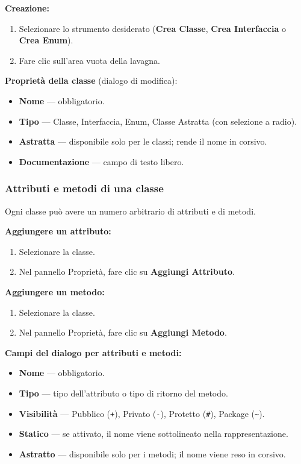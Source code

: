 \documentclass[a4paper,11pt]{article}
\newcommand{\uielement}[1]{\textbf{#1}}
\begin{document}
\textbf{Creazione:}
\begin{enumerate}
  \item Selezionare lo strumento desiderato (\uielement{Crea Classe}, \uielement{Crea Interfaccia}
        o \uielement{Crea Enum}).
  \item Fare clic sull'area vuota della lavagna.
\end{enumerate}

\textbf{Proprietà della classe} (dialogo di modifica):
\begin{itemize}
  \item \textbf{Nome} --- obbligatorio.
  \item \textbf{Tipo} --- Classe, Interfaccia, Enum, Classe Astratta (con selezione a radio).
  \item \textbf{Astratta} --- disponibile solo per le classi; rende il nome in corsivo.
  \item \textbf{Documentazione} --- campo di testo libero.
\end{itemize}

\subsubsection{Attributi e metodi di una classe}

Ogni classe può avere un numero arbitrario di attributi e di metodi.

\textbf{Aggiungere un attributo:}
\begin{enumerate}
  \item Selezionare la classe.
  \item Nel pannello Proprietà, fare clic su \uielement{Aggiungi Attributo}.
\end{enumerate}

\textbf{Aggiungere un metodo:}
\begin{enumerate}
  \item Selezionare la classe.
  \item Nel pannello Proprietà, fare clic su \uielement{Aggiungi Metodo}.
\end{enumerate}

\textbf{Campi del dialogo per attributi e metodi:}
\begin{itemize}
  \item \textbf{Nome} --- obbligatorio.
  \item \textbf{Tipo} --- tipo dell'attributo o tipo di ritorno del metodo.
  \item \textbf{Visibilità} --- Pubblico (\texttt{+}), Privato (\texttt{-}),
        Protetto (\texttt{\#}), Package (\texttt{\textasciitilde}).
  \item \textbf{Statico} --- se attivato, il nome viene sottolineato nella rappresentazione.
  \item \textbf{Astratto} --- disponibile solo per i metodi; il nome viene reso in corsivo.
\end{itemize}
\end{document}
